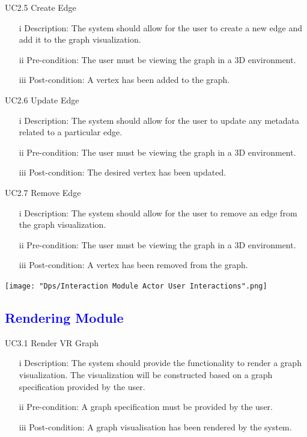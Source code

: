 \documentclass[12pt]{article}
\begin{document}
\begin{flushleft}
UC2.5 Create Edge
\begin{itemize}
\item[i] Description: The system should allow for the user to create a new edge and add it to the graph visualization.
\item[ii] Pre-condition: The user must be viewing the graph in a 3D environment.
\item[iii] Post-condition: A vertex has been added to the graph.
\end{itemize}
\end{flushleft}

\bigskip

\begin{flushleft}
UC2.6 Update Edge
\begin{itemize}
\item[i] Description: The system should allow for the user to update any metadata related to a particular edge.
\item[ii] Pre-condition: The user must be viewing the graph in a 3D environment.
\item[iii] Post-condition: The desired vertex has been updated.
\end{itemize}
\end{flushleft}

\bigskip

\begin{flushleft}
UC2.7 Remove Edge
\begin{itemize}
\item[i] Description: The system should allow for the user to remove an edge from the graph visualization.
\item[ii] Pre-condition: The user must be viewing the graph in a 3D environment.
\item[iii] Post-condition: A vertex has been removed from the graph.
\end{itemize}
\end{flushleft}

\texttt{[image: "Dps/Interaction Module Actor User Interactions".png]}

\textcolor{blue}{\subsection{Rendering Module}}

\begin{flushleft}
UC3.1 Render VR Graph
\begin{itemize}
\item[i] Description: The system should provide the functionality to render a graph visualization. The visualization will be constructed based on a graph specification provided by the user.
\item[ii] Pre-condition: A graph specification must be provided by the user.
\item[iii] Post-condition: A graph visualisation has been rendered by the system.
\end{itemize}
\end{flushleft}
\end{document}

